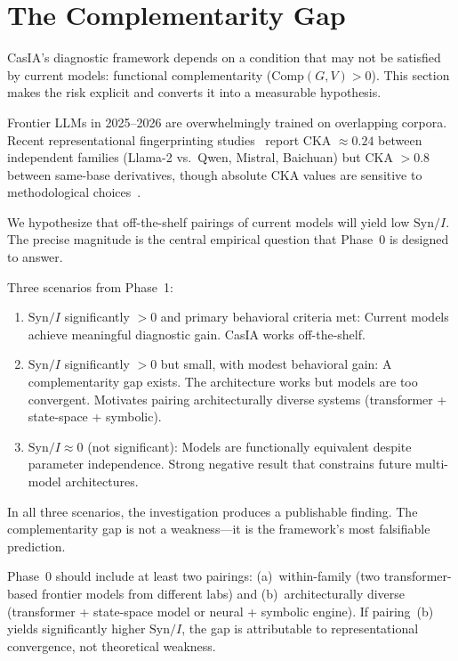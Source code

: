 \documentclass[11pt,a4paper]{article}
\theoremstyle{definition}
\begin{document}
\section{The Complementarity Gap}
\label{sec:compgap}

CasIA's diagnostic framework depends on a condition that may not be satisfied by current models: functional complementarity ($\mathrm{Comp}(G,V) > 0$). This section makes the risk explicit and converts it into a measurable hypothesis.

Frontier LLMs in 2025--2026 are overwhelmingly trained on overlapping corpora. Recent representational fingerprinting studies~\cite{zhang2025reef} report CKA $\approx 0.24$ between independent families (Llama-2 vs.\ Qwen, Mistral, Baichuan) but CKA $> 0.8$ between same-base derivatives, though absolute CKA values are sensitive to methodological choices~\cite{davari2022cka}.

We hypothesize that off-the-shelf pairings of current models will yield low $\mathrm{Syn}/I$. The precise magnitude is the central empirical question that Phase~0 is designed to answer.

Three scenarios from Phase~1:
\begin{enumerate}[leftmargin=*,itemsep=3pt]
\item $\mathrm{Syn}/I$ significantly $> 0$ and primary behavioral criteria met: Current models achieve meaningful diagnostic gain. CasIA works off-the-shelf.
\item $\mathrm{Syn}/I$ significantly $> 0$ but small, with modest behavioral gain: A complementarity gap exists. The architecture works but models are too convergent. Motivates pairing architecturally diverse systems (transformer + state-space + symbolic).
\item $\mathrm{Syn}/I \approx 0$ (not significant): Models are functionally equivalent despite parameter independence. Strong negative result that constrains future multi-model architectures.
\end{enumerate}

In all three scenarios, the investigation produces a publishable finding. The complementarity gap is not a weakness---it is the framework's most falsifiable prediction.

Phase~0 should include at least two pairings: (a)~within-family (two transformer-based frontier models from different labs) and (b)~architecturally diverse (transformer + state-space model or neural + symbolic engine). If pairing~(b) yields significantly higher $\mathrm{Syn}/I$, the gap is attributable to representational convergence, not theoretical weakness.
\end{document}
